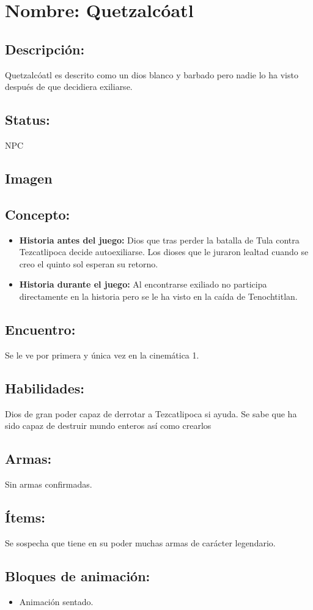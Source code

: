 \section{Nombre: Quetzalcóatl}  \label{per:quetzalcoatl}
\subsection{Descripción:}
Quetzalcóatl es descrito como un dios blanco y barbado pero nadie lo ha visto después de que decidiera exiliarse.
\subsection{Status:}
NPC 
\subsection{Imagen}
\subsection{Concepto:}
\begin{itemize}
	\item \textbf{Historia antes del juego:}
	Dios que tras perder la batalla de Tula contra Tezcatlipoca decide autoexiliarse. Los dioses que le juraron lealtad cuando se creo el quinto sol esperan su retorno.
	\item \textbf{Historia durante el juego:}
	Al encontrarse exiliado no participa directamente en la historia pero se le ha visto en la caída de Tenochtitlan.
\end{itemize} 
\subsection{Encuentro:}
Se le ve por primera y única vez en la cinemática 1.
\subsection{Habilidades:}
Dios de gran poder capaz de derrotar a Tezcatlipoca si ayuda. Se sabe que ha sido capaz de destruir mundo enteros así como crearlos
\subsection{Armas:}
Sin armas confirmadas.
\subsection{Ítems:}
Se sospecha que tiene en su poder muchas armas de carácter legendario.
\subsection{Bloques de animación:}
	\begin{itemize}
		\item Animación sentado.
	\end{itemize}